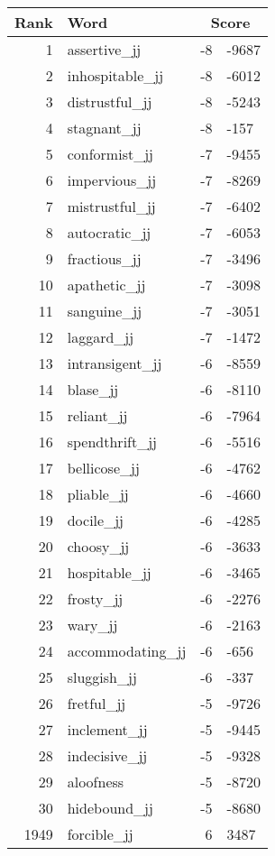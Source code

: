 \begin{longtable}[!htbp]{| rlr@{.}l |}
    \hline
    \textbf{Rank} & \textbf{Word} & \multicolumn{2}{c|}{\textbf{Score}} \\
    \hline
    \endhead
    1 & assertive\_jj & -8 & -9687 \\
    2 & inhospitable\_jj & -8 & -6012 \\
    3 & distrustful\_jj & -8 & -5243 \\
    4 & stagnant\_jj & -8 & -157 \\
    5 & conformist\_jj & -7 & -9455 \\
    6 & impervious\_jj & -7 & -8269 \\
    7 & mistrustful\_jj & -7 & -6402 \\
    8 & autocratic\_jj & -7 & -6053 \\
    9 & fractious\_jj & -7 & -3496 \\
    10 & apathetic\_jj & -7 & -3098 \\
    11 & sanguine\_jj & -7 & -3051 \\
    12 & laggard\_jj & -7 & -1472 \\
    13 & intransigent\_jj & -6 & -8559 \\
    14 & blase\_jj & -6 & -8110 \\
    15 & reliant\_jj & -6 & -7964 \\
    16 & spendthrift\_jj & -6 & -5516 \\
    17 & bellicose\_jj & -6 & -4762 \\
    18 & pliable\_jj & -6 & -4660 \\
    19 & docile\_jj & -6 & -4285 \\
    20 & choosy\_jj & -6 & -3633 \\
    21 & hospitable\_jj & -6 & -3465 \\
    22 & frosty\_jj & -6 & -2276 \\
    23 & wary\_jj & -6 & -2163 \\
    24 & accommodating\_jj & -6 & -656 \\
    25 & sluggish\_jj & -6 & -337 \\
    26 & fretful\_jj & -5 & -9726 \\
    27 & inclement\_jj & -5 & -9445 \\
    28 & indecisive\_jj & -5 & -9328 \\
    29 & aloofness & -5 & -8720 \\
    30 & hidebound\_jj & -5 & -8680 \\
    1949 & forcible\_jj & 6 & 3487 \\

\end{longtable}
